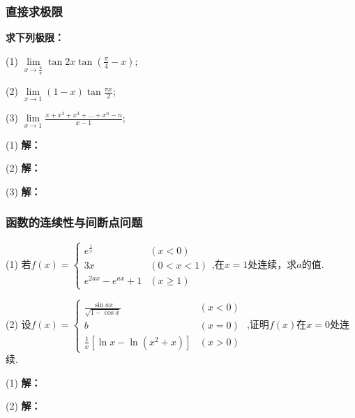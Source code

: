 \documentclass[12pt , a4paper , oneside]{ctexart}
\begin{document}
            \subsubsection{直接求极限}
            \textbf{求下列极限：}

            (1) $\lim\limits_{x \to \frac{4}{\pi}} \tan{2x} \tan{(\frac{\pi}{4}-x)}$;

            (2) $\lim\limits_{x \to 1} (1-x)\tan{\frac{\pi x}{2}}$;

            (3) $\lim\limits_{x \to 1} \frac{x+x^2+x^3+...+x^n - n}{x-1}$;

            \begin{mdframed}
            (1) \textbf{解：}
            \end{mdframed}

            \begin{mdframed}
            (2) \textbf{解：}
            \end{mdframed}

            \begin{mdframed}
            (3) \textbf{解：}
            \end{mdframed}

            \subsubsection{函数的连续性与间断点问题}
            (1) 若$f(x) = \begin{cases}
                e^{\frac{1}{x}} & (x < 0)\\
                3x & (0<x<1)\\
                e^{2ax} - e^{ax} + 1 & (x \geqslant 1)
            \end{cases}$,在$x=1$处连续，求$a$的值.

            (2) 设$f(x) = \begin{cases}
                \frac{\sin{ax}}{\sqrt{1-\cos{x}}} & (x < 0)\\
                b & (x = 0)\\
                \frac{1}{x} [ \ln{x}-\ln{(x^2 + x)} ] & (x > 0)\end{cases}$
                ,证明$f(x)$在$x=0$处连续.
            \begin{mdframed}
            (1) \textbf{解：}
            \end{mdframed}

            \begin{mdframed}
            (2) \textbf{解：}
            \end{mdframed}
\end{document}
